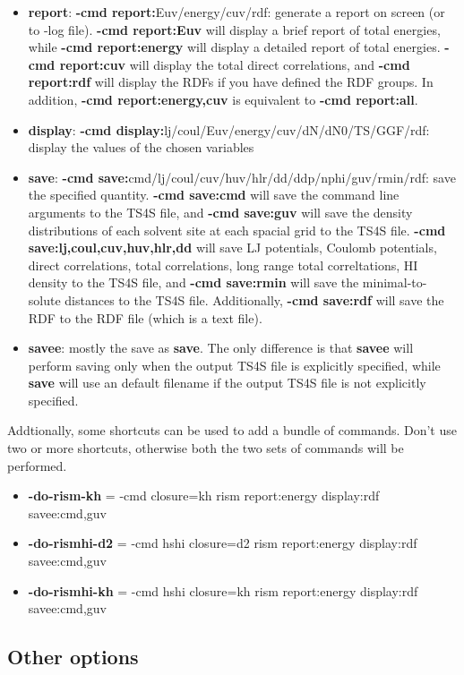 \documentclass[aip,amsmath,amssymb,reprint,onecolumn]{revtex4-1}
\begin{document}
\begin{itemize}
    \item {\bf report}: {\bf -cmd report:}Euv/energy/cuv/rdf: generate a report on screen (or to -log file). {\bf -cmd report:Euv} will display a brief report of total energies, while {\bf -cmd report:energy} will display a detailed report of total energies. {\bf -cmd report:cuv} will display the total direct correlations, and {\bf -cmd report:rdf} will display the RDFs if you have defined the RDF groups. In addition, {\bf -cmd report:energy,cuv} is equivalent to {\bf -cmd report:all}.
    \item {\bf display}: {\bf -cmd display:}lj/coul/Euv/energy/cuv/dN/dN0/TS/GGF/rdf: display the values of the chosen variables
    \item {\bf save}: {\bf -cmd save:}cmd/lj/coul/cuv/huv/hlr/dd/ddp/nphi/guv/rmin/rdf: save the specified quantity. {\bf -cmd save:cmd} will save the command line arguments to the TS4S file, and {\bf -cmd save:guv} will save the density distributions of each solvent site at each spacial grid to the TS4S file. {\bf -cmd save:lj,coul,cuv,huv,hlr,dd} will save LJ potentials, Coulomb potentials, direct correlations, total correlations, long range total correltations, HI density to the TS4S file, and {\bf -cmd save:rmin} will save the minimal-to-solute distances to the TS4S file. Additionally, {\bf -cmd save:rdf} will save the RDF to the RDF file (which is a text file).
    \item {\bf savee}: mostly the save as {\bf save}. The only difference is that {\bf savee} will perform saving only when the output TS4S file is explicitly specified, while {\bf save} will use an default filename if the output TS4S file is not explicitly specified.
\end{itemize}

Addtionally, some shortcuts can be used to add a bundle of commands. Don't use two or more shortcuts, otherwise both the two sets of commands will be performed.

\begin{itemize}
    \item {\bf -do-rism-kh} = -cmd closure=kh rism report:energy display:rdf savee:cmd,guv
    \item {\bf -do-rismhi-d2} = -cmd hshi closure=d2 rism report:energy display:rdf savee:cmd,guv
    \item {\bf -do-rismhi-kh} = -cmd hshi closure=kh rism report:energy display:rdf savee:cmd,guv
\end{itemize}

\subsection{Other options}\label{sec:param.options}
\end{document}
